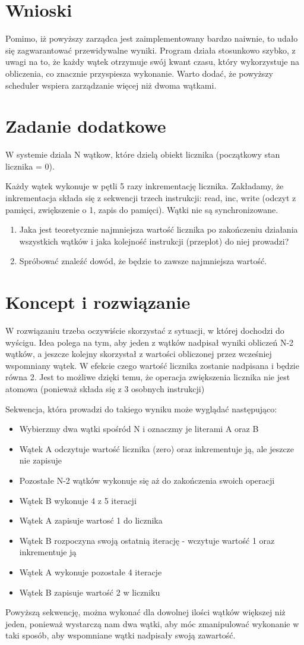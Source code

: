 \documentclass[12pt]{article}
\begin{document}
\section{Wnioski}
Pomimo, iż powyższy zarządca jest zaimplementowany bardzo naiwnie, to udało się zagwarantować przewidywalne wyniki. Program działa stosunkowo szybko, z uwagi na to, że każdy wątek otrzymuje swój kwant czasu, który wykorzystuje na obliczenia, co znacznie przyspiesza wykonanie. Warto dodać, że powyższy scheduler wspiera zarządzanie więcej niż dwoma wątkami.

\section{Zadanie dodatkowe}
W systemie dziala N wątkow, które dzielą obiekt licznika (początkowy stan licznika = 0).

Każdy wątek wykonuje w pętli 5 razy inkrementację licznika. Zakładamy, że inkrementacja składa się z sekwencji trzech instrukcji: read, inc, write (odczyt z pamięci, zwiększenie o 1, zapis do pamięci). Wątki nie są synchronizowane.
\begin{enumerate}
    \item Jaka jest teoretycznie najmniejsza wartość licznika po zakończeniu działania wszystkich wątków i jaka kolejność instrukcji (przeplot) do niej prowadzi?
    \item Spróbować znaleźć dowód, że będzie to zawsze najmniejsza wartość.
\end{enumerate}

\section{Koncept i rozwiązanie}
W rozwiązaniu trzeba oczywiście skorzystać z sytuacji, w której dochodzi do wyścigu. Idea polega na tym, aby jeden z wątków nadpisał wyniki obliczeń N-2 wątków, a jeszcze kolejny skorzystał z wartości obliczonej przez wcześniej wspomniany wątek. W efekcie czego wartość licznika zostanie nadpisana i będzie równa 2. Jest to możliwe dzięki temu, że operacja zwiększenia licznika nie jest atomowa (ponieważ składa się z 3 osobnych instrukcji)
\par
Sekwencja, która prowadzi do takiego wyniku może wyglądać następująco:
\begin{itemize}
    \item Wybierzmy dwa wątki spośród N i oznaczmy je literami A oraz B
    \item Wątek A odczytuje wartość licznika (zero) oraz inkrementuje ją, ale jeszcze nie zapisuje
    \item Pozostałe N-2 wątków wykonuje się aż do zakończenia swoich operacji
    \item Wątek B wykonuje 4 z 5 iteracji
    \item Wątek A zapisuje wartosć 1 do licznika
    \item Wątek B rozpoczyna swoją ostatnią iterację - wczytuje wartość 1 oraz inkrementuje ją
    \item Wątek A wykonuje pozostałe 4 iteracje
    \item Wątek B zapisuje wartość 2 w liczniku
\end{itemize}

Powyższą sekwencję, można wykonać dla dowolnej ilości wątków większej niż jeden, ponieważ wystarczą nam dwa wątki, aby móc zmanipulować wykonanie w taki sposób, aby wspomniane wątki nadpisały swoją zawartość.
\end{document}
